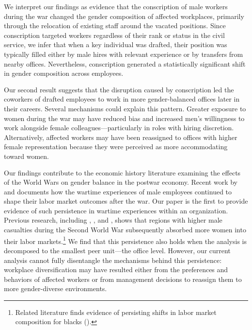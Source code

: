 \vspace{1em}
\color{gray}
We interpret our findings as evidence that the conscription of male workers during the war changed the gender composition of affected workplaces, primarily through the relocation of existing staff around the vacated positions. Since conscription targeted workers regardless of their rank or status in the civil service, we infer that when a key individual was drafted, their position was typically filled either by male hires with relevant experience or by transfers from nearby offices. Nevertheless, conscription generated a statistically significant shift in gender composition across employees.

Our second result suggests that the disruption caused by conscription led the coworkers of drafted employees to work in more gender-balanced offices later in their careers. Several mechanisms could explain this pattern. Greater exposure to women during the war may have reduced bias and increased men's willingness to work alongside female colleagues—particularly in roles with hiring discretion. Alternatively, affected workers may have been reassigned to offices with higher female representation because they were perceived as more accommodating toward women.
\color{black}
\vspace{2em}

Our findings contribute to the economic history literature examining the effects of the World Wars on gender balance in the postwar economy. Recent work by \citet{NBERw32639} and \citet{doi:10.1086/719277} documents how the wartime experiences of male employees continued to shape their labor market outcomes after the war. Our paper is the first to provide evidence of such persistence in wartime experiences within an organization. Previous research, including \citet{doi:10.1086/383100}, \citet{101221}, and \citet{10.1093/restud/rdv010}, shows that regions with higher male casualties during the Second World War subsequently absorbed more women into their labor markets.\footnote{Related literature finds evidence of persisting shifts in labor market composition for blacks (\cite{doi:10.1086/716921}).} We find that this persistence also holds when the analysis is decomposed to the smallest peer unit—the office level. However, our current analysis cannot fully disentangle the mechanisms behind this persistence: workplace diversification may have resulted either from the preferences and behaviors of affected workers or from management decisions to reassign them to more gender-diverse environments.

